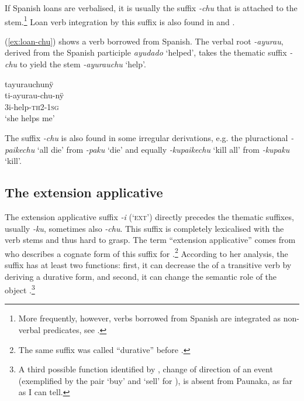 If Spanish loans are verbalised, it is usually the suffix \textit{-chu} that is attached to the stem.\footnote{More frequently, however, verbs borrowed from Spanish are integrated as non-verbal predicates, see .} Loan verb integration by this suffix is also found in  and  \citep[4]{Terhart_subm}. 

(\ref{ex:loan-chu}) shows a verb borrowed from Spanish. The verbal root \textit{-ayurau}, derived from the Spanish participle \textit{ayudado} ‘helped’, takes the thematic suffix \textit{-chu} to yield the stem \textit{-ayurauchu} ‘help’.

\ea\label{ex:loan-chu}
\begingl
\glpreamble tayurauchunÿ\\
\gla ti-ayurau-chu-nÿ\\
\glb 3i-help-\textsc{th}2-1\textsc{sg}\\
\glft ‘she helps me’
\endgl
\trailingcitation{[mxx-n101017s-2.054]}
\xe
{}

The suffix \textit{-chu} is also found in some irregular derivations, e.g. the pluractional \textit{-paikechu} ‘all die’ from \textit{-paku} ‘die’ and equally \textit{-kupaikechu} ‘kill all’ from \textit{-kupaku} ‘kill’.

%
\subsection{The extension applicative}\label{sec:EXTApplicative}

The extension applicative suffix \textit{-i} (‘\textsc{ext}’) directly precedes the thematic suffixes, usually \textit{-ku}, sometimes also \textit{-chu}. This suffix is completely lexicalised with the verb stems and thus hard to grasp. The term “extension applicative” comes from \citet[]{Danielsen2014a} who describes a cognate form of this suffix for .\footnote{The same  suffix was called “durative” before \citep[cf.][232--234]{Danielsen2007}.} According to her analysis, the suffix has at least two functions: first, it can decrease the  of a transitive verb by deriving a durative form, and second, it can change the semantic role of the object \citep[297, 299]{Danielsen2014a}.\footnote{A third possible function identified by \citet[300]{Danielsen2014a}, change of direction of an event (exemplified by the pair ‘buy’ and ‘sell’ for ), is absent from Paunaka, as far as I can tell.}

